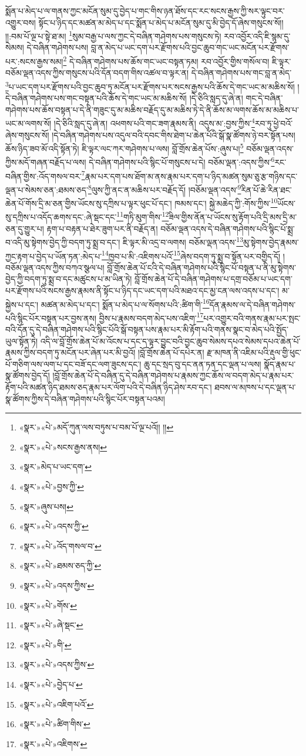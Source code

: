 སྨོན་པ་མེད་པ་ལ་གནས་ཀྱང་མངོན་སུམ་དུ་བྱེད་པ་གང་གིས་ཉན་ཐོས་དང་རང་སངས་རྒྱས་ཀྱི་སར་ལྟུང་བར་འགྱུར་བས། སྟོང་པ་ཉིད་དང་མཚན་མ་མེད་པ་དང་སྨོན་པ་མེད་པ་མངོན་སུམ་དུ་མི་བྱེད་དོ་ཞེས་གསུངས་སོ།། །།:བམ་པོ་ལྔ་པ་སྟེ་ཐ་མ། \footnote{«སྣར་»«པེ་»མདོ་ཀུན་ལས་བཏུས་པ་བམ་པོ་ལྔ་པའོ།། །། }སུམ་བརྒྱ་པ་ལས་ཀྱང་དེ་བཞིན་གཤེགས་པས་གསུངས་ཏེ། རབ་འབྱོར་འདི་ཇི་སྙམ་དུ་སེམས། དེ་བཞིན་གཤེགས་པས། བླ་ན་མེད་པ་ཡང་དག་པར་རྫོགས་པའི་བྱང་ཆུབ་གང་ཡང་མངོན་པར་རྫོགས་པར་:སངས་རྒྱས་སམ།\footnote{«སྣར་»«པེ་»སངས་རྒྱས་ནས།} དེ་བཞིན་གཤེགས་པས་ཆོས་གང་ཡང་བསྟན་ཏམ། རབ་འབྱོར་གྱིས་གསོལ་བ། ཇི་ལྟར་བཅོམ་ལྡན་འདས་ཀྱིས་གསུངས་པའི་དོན་བདག་གིས་འཚལ་བ་ལྟར་ན། དེ་བཞིན་གཤེགས་པས་གང་བླ་ན་མེད་\footnote{«སྣར་»མེད་པ་ཡང་དག་}པ་ཡང་དག་པར་རྫོགས་པའི་བྱང་ཆུབ་ཏུ་མངོན་པར་རྫོགས་པར་སངས་རྒྱས་པའི་ཆོས་དེ་གང་ཡང་མ་མཆིས་སོ། །དེ་བཞིན་གཤེགས་པས་གང་བསྟན་པའི་ཆོས་དེ་གང་ཡང་མ་མཆིས་སོ། །དེ་ཅིའི་སླད་དུ་ཞེ་ན། གང་དེ་བཞིན་གཤེགས་པས་ཆོས་བསྟན་པ་དེ་ནི་གཟུང་དུ་མ་མཆིས་བརྗོད་དུ་མ་མཆིས་ཏེ་དེ་ནི་ཆོས་མ་ལགས་ཆོས་མ་མཆིས་པ་ཡང་མ་ལགས་སོ། །དེ་ཅིའི་སླད་དུ་ཞེ་ན། འཕགས་པའི་གང་ཟག་རྣམས་ནི། འདུས་མ་:བྱས་ཀྱིས་\footnote{«སྣར་»«པེ་»བྱས་ཀྱི་}རབ་ཏུ་ཕྱེ་བའོ་ཞེས་གསུངས་སོ། །དེ་བཞིན་གཤེགས་པས་འདུལ་བའི་དབང་གིས་ཐེག་པ་ཆེན་པོའི་སྒོ་སྣ་ཚོགས་ཉེ་བར་སྟོན་པས། ཆོས་ཉིད་ཟབ་མོ་འདི་སྟོན་ཏེ། ཇི་ལྟར་ལང་ཀར་གཤེགས་པ་ལས། བློ་གྲོས་ཆེན་པོས་:ཞུས་པ།\footnote{«སྣར་»ཞུས་པས།} བཅོམ་ལྡན་འདས་ཀྱིས་མདོ་གཞན་བརྗོད་པ་ལས། དེ་བཞིན་གཤེགས་པའི་སྙིང་པོ་གསུངས་པ་དེ། བཅོམ་ལྡན་:འདས་ཀྱིས་\footnote{«སྣར་»«པེ་»འདས་ཀྱི་}རང་བཞིན་གྱིས་:འོད་གསལ་བར་\footnote{«སྣར་»«པེ་»འོད་གསལ་བ་}རྣམ་པར་དག་པས་ཐོག་མ་ནས་རྣམ་པར་དག་པ་ཉིད་མཚན་སུམ་ཅུ་རྩ་གཉིས་དང་ལྡན་པ་སེམས་ཅན་:ཐམས་ཅད་\footnote{«སྣར་»«པེ་»ཐམས་ཅད་ཀྱི་}ལུས་ཀྱི་ནང་ན་མཆིས་པར་བརྗོད་དོ། །བཅོམ་ལྡན་འདས་\footnote{«སྣར་»«པེ་»འདས་ཀྱིས་}རིན་པོ་ཆེ་རིན་ཐང་ཆེན་པོ་གོས་དྲི་མ་ཅན་གྱིས་ཡོངས་སུ་དཀྲིས་པ་ལྟར་ཕུང་པོ་དང་། ཁམས་དང་། སྐྱེ་མཆེད་ཀྱི་:གོས་ཀྱིས་\footnote{«སྣར་»«པེ་»གོས་}ཡོངས་སུ་དཀྲིས་པ་འདོད་ཆགས་དང་:ཞེ་སྡང་དང་\footnote{«སྣར་»«པེ་»ཞེ་སྡང་}གཏི་མུག་གིས་\footnote{«སྣར་»«པེ་»གི་}ཟིལ་གྱིས་ནོན་པ་ཡོངས་སུ་རྟོག་པའི་དྲི་མས་དྲི་མ་ཅན་དུ་གྱུར་པ། རྟག་པ་བརྟན་པ་ཐེར་ཟུག་པར་ནི་བརྗོད་ན། བཅོམ་ལྡན་འདས་དེ་བཞིན་གཤེགས་པའི་སྙིང་པོ་སྨྲ་བ་འདི་མུ་སྟེགས་བྱེད་ཀྱི་བདག་ཏུ་སྨྲ་བ་དང་། ཇི་ལྟར་མི་འདྲ་བ་ལགས། བཅོམ་ལྡན་འདས་\footnote{«སྣར་»«པེ་»འདས་ཀྱིས་}མུ་སྟེགས་བྱེད་རྣམས་ཀྱང་རྟག་པ་བྱེད་པ་ཡོན་ཏན་:མེད་པ་\footnote{«སྣར་»«པེ་»བྱེད་པ་}ཁྱབ་པ་མི་:འཇིགས་པའོ་\footnote{«སྣར་»«པེ་»འཇིག་པའོ་}ཞེས་བདག་ཏུ་སྨྲ་བ་སྟོན་པར་བགྱིད་དོ། །བཅོམ་ལྡན་འདས་ཀྱིས་བཀའ་སྩལ་པ། བློ་གྲོས་ཆེན་པོ་ངའི་དེ་བཞིན་གཤེགས་པའི་སྙིང་པོ་བསྟན་པ་ནི་མུ་སྟེགས་བྱེད་ཀྱི་བདག་ཏུ་སྨྲ་བ་དང་མཚུངས་པ་མ་ཡིན་ཏེ། བློ་གྲོས་ཆེན་པོ་དེ་བཞིན་གཤེགས་པ་དགྲ་བཅོམ་པ་ཡང་དག་པར་རྫོགས་པའི་སངས་རྒྱས་རྣམས་ནི་སྟོང་པ་ཉིད་དང་ཡང་དག་པའི་མཐའ་དང་མྱ་ངན་ལས་འདས་པ་དང་། མ་སྐྱེས་པ་དང་། མཚན་མ་མེད་པ་དང་། སྨོན་པ་མེད་པ་ལ་སོགས་པའི་:ཚིག་གི་\footnote{«སྣར་»«པེ་»ཚིག་གིས་}དོན་རྣམས་ལ་དེ་བཞིན་གཤེགས་པའི་སྙིང་པོར་བསྟན་པར་བྱས་ནས། བྱིས་པ་རྣམས་བདག་མེད་པས་འཇིག་\footnote{«སྣར་»«པེ་»འཇིགས་}པར་འགྱུར་བའི་གནས་རྣམ་པར་སྤང་བའི་དོན་དུ་དེ་བཞིན་གཤེགས་པའི་སྙིང་པོའི་སྒོ་བསྟན་པས་རྣམ་པར་མི་རྟོག་པའི་གནས་སྣང་བ་མེད་པའི་སྤྱོད་ཡུལ་སྟོན་ཏེ། འདི་ལ་བློ་གྲོས་ཆེན་པོ་མ་འོངས་པ་དང་ད་ལྟར་བྱུང་བའི་བྱང་ཆུབ་སེམས་དཔའ་སེམས་དཔའ་ཆེན་པོ་རྣམས་ཀྱིས་བདག་ཏུ་མངོན་པར་ཞེན་པར་མི་བྱའོ། །བློ་གྲོས་ཆེན་པོ་དཔེར་ན། རྫ་མཁན་ནི་འཇིམ་པའི་རྡུལ་གྱི་ཕུང་པོ་གཅིག་ལས་ལག་པ་དང་བཟོ་དང་ལག་ཟུངས་དང་། ཆུ་དང་སྲད་བུ་དང་ནན་ཏན་དང་ལྡན་པ་ལས། སྣོད་རྣམ་པ་སྣ་ཚོགས་བྱེད་དོ། །བློ་གྲོས་ཆེན་པོ་དེ་བཞིན་དུ་དེ་བཞིན་གཤེགས་པ་རྣམས་ཀྱང་ཆོས་ལ་བདག་མེད་པ་རྣམ་པར་རྟོག་པའི་མཚན་ཉིད་ཐམས་ཅད་རྣམ་པར་ལོག་པའི་དེ་བཞིན་ཉིད་ཤེས་རབ་དང་། ཐབས་ལ་མཁས་པ་དང་ལྡན་པ་སྣ་ཚོགས་ཀྱིས་དེ་བཞིན་གཤེགས་པའི་སྙིང་པོར་བསྟན་པའམ། 